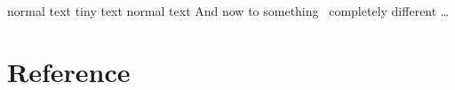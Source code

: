 \documentclass[final]{beamer}
\begin{document}
\begin{frame}
normal text
\tiny
tiny text
\normalsize
normal text
And now to something~\cite{guo2017improved} completely different \dots
\end{frame}

%


\section{Reference}
\begin{frame}
\printbibliography
\end{frame}

\end{document}

